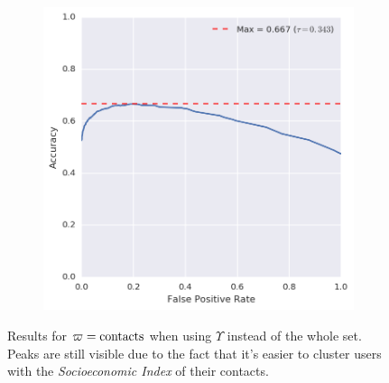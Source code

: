 \begin{figure}[p]
\begin{subfigure}[b]{.49\textwidth}
	\includegraphics[height=.20\textheight]{figures/bayes/least1/accuracy_contacts.png}
\end{subfigure}
\caption{Results for $\varpi = \operatorname{contacts}$ when using $\hat{\Upsilon}$ instead of the whole set. Peaks are still visible due to the fact that it's easier to cluster users with the \emph{Socioeconomic Index} of their contacts.}
\end{figure}
